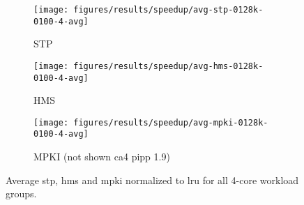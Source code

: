 \begin{figure}[th]
    \centering
    \begin{subfigure}[b]{0.5\textwidth}
        \texttt{[image: figures/results/speedup/avg-stp-0128k-0100-4-avg]}
        \caption{STP}
        \label{fig:results:base:4-avg:stp}
    \end{subfigure}%
    \begin{subfigure}[b]{0.5\textwidth}
        \texttt{[image: figures/results/speedup/avg-hms-0128k-0100-4-avg]}
        \caption{HMS}
        \label{fig:results:base:4-avg:hms}
    \end{subfigure}
    \begin{subfigure}[b]{0.5\textwidth}
        \texttt{[image: figures/results/speedup/avg-mpki-0128k-0100-4-avg]}
        \caption{MPKI (not shown ca4 pipp 1.9)}
        \label{fig:results:base:4-avg:mpki}
    \end{subfigure}
    \caption[Average result for 4-core workloads]{Average \gls{stp}, \gls{hms} and \gls{mpki} normalized to \gls{lru} for all 4-core workload groups.}
    \label{fig:results:base:4-avg} 
\end{figure}


